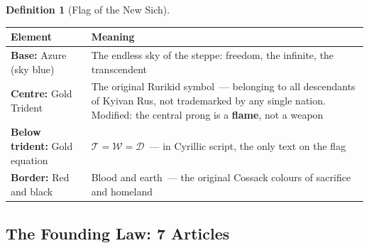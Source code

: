 \documentclass[11pt,a4paper]{article}
\theoremstyle{definition}
\newtheorem{definition}[theorem]{Definition}
\theoremstyle{remark}
\newcommand{\Thought}{\mathcal{T}}
\newcommand{\Word}{\mathcal{W}}
\newcommand{\Deed}{\mathcal{D}}
\begin{document}
\begin{definition}[Flag of the New Sich]
\label{def:sich-flag}
\begin{center}
\begin{tabular}{@{}p{}p{}@{}}
\toprule
\textbf{Element} & \textbf{Meaning} \\
\midrule
\textbf{Base:} Azure (sky blue) &
  The endless sky of the steppe:
  freedom, the infinite, the transcendent \\[4pt]
\textbf{Centre:} Gold Trident &
  The original Rurikid symbol~---
  belonging to all descendants of Kyivan Rus,
  not trademarked by any single nation.
  Modified: the central prong is a \textbf{flame},
  not a weapon \\[4pt]
\textbf{Below trident:} Gold equation &
  $\Thought = \Word = \Deed$~---
  in Cyrillic script, the only text on the flag \\[4pt]
\textbf{Border:} Red and black &
  Blood and earth~---
  the original Cossack colours of
  sacrifice and homeland \\
\bottomrule
\end{tabular}
\end{center}
\end{definition}

\subsection{The Founding Law: 7 Articles}
\label{sec:sich-law}
\end{document}
